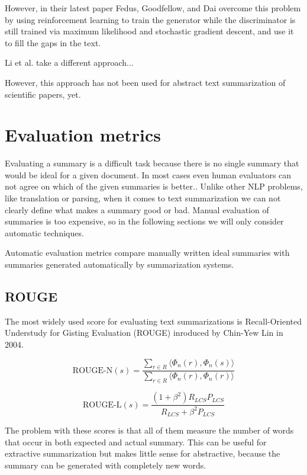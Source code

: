 \documentclass[sigplan]{acmart}
\begin{document}
However, in their latest paper Fedus, Goodfellow, and Dai\cite{fedus-18} overcome this problem by using reinforcement learning to train the generator while the discriminator is still trained via maximum likelihood and stochastic gradient descent, and use it to fill the gaps in the text.

Li et al.\cite{li-pan-18} take a different approach...
 
However, this approach has not been used for abstract text summarization of scientific papers, yet.

\section{Evaluation metrics}

Evaluating a summary is a difficult task because there is no single summary that would be ideal for a given document. In most cases even human evaluators can not agree on which of the given summaries is better.\cite{das-7}. Unlike other NLP problems, like translation or parsing, when it comes to text summarization we can not clearly define what makes a summary good or bad. Manual evaluation of summaries is too expensive, so in the following sections we will only consider automatic techniques. 

Automatic evaluation metrics compare manually written ideal summaries with summaries generated automatically by summarization systems.

\subsection{ROUGE}

The most widely used score for evaluating text summarizations is Recall-Oriented Understudy for Gisting Evaluation (ROUGE) inroduced by Chin-Yew Lin in 2004\cite{lin-4}\cite{das-7}\cite{kishore-2}.

\[ \text{ROUGE-N}(s) = \frac{\sum_{r \in R} \langle \Phi_n(r), \Phi_n(s) \rangle}{\sum_{r \in R} \langle \Phi_n(r), \Phi_n(r) \rangle} \]

\[ \text{ROUGE-L}(s) = \frac{(1 + \beta^2) R_{LCS} P_{LCS}}{R_{LCS} + \beta^2 P_{LCS}} \]

The problem with these scores is that all of them measure the number of words that occur in both expected and actual summary. This can be useful for extractive summarization but makes little sense for abstractive, because the summary can be generated with completely new words.
\end{document}
